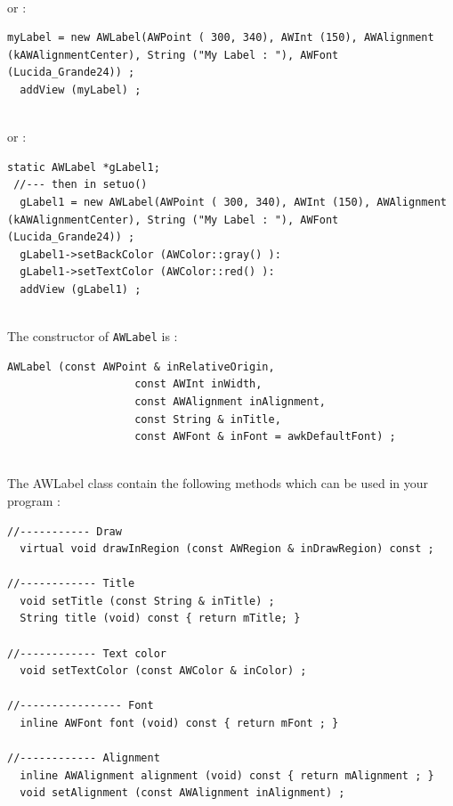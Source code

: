 \documentclass[a4paper,11pt]{extarticle}
\begin{document}
~\\ or :

\begin{lstlisting}[language=Arduinonl]
  myLabel = new AWLabel(AWPoint ( 300, 340), AWInt (150), AWAlignment (kAWAlignmentCenter), String ("My Label : "), AWFont (Lucida_Grande24)) ;
  addView (myLabel) ;
\end{lstlisting}

~\\ or :

\begin{lstlisting}[language=Arduinonl]
 static AWLabel *gLabel1;
 //--- then in setuo()
  gLabel1 = new AWLabel(AWPoint ( 300, 340), AWInt (150), AWAlignment (kAWAlignmentCenter), String ("My Label : "), AWFont (Lucida_Grande24)) ;
  gLabel1->setBackColor (AWColor::gray() ):
  gLabel1->setTextColor (AWColor::red() ):
  addView (gLabel1) ;
\end{lstlisting}

~\\ The constructor of \texttt{AWLabel} is :

\begin{lstlisting}[language=Arduinonl]
  AWLabel (const AWPoint & inRelativeOrigin,
                    const AWInt inWidth,
                    const AWAlignment inAlignment,
                    const String & inTitle,
                    const AWFont & inFont = awkDefaultFont) ;
\end{lstlisting}

~\\ The AWLabel class contain the following methods which can be used in your program :

\begin{lstlisting}[language=Arduinonl]
//----------- Draw
  virtual void drawInRegion (const AWRegion & inDrawRegion) const ;

//------------ Title
  void setTitle (const String & inTitle) ;
  String title (void) const { return mTitle; }

//------------ Text color
  void setTextColor (const AWColor & inColor) ;

//---------------- Font
  inline AWFont font (void) const { return mFont ; }

//------------ Alignment
  inline AWAlignment alignment (void) const { return mAlignment ; }
  void setAlignment (const AWAlignment inAlignment) ;
\end{lstlisting}
\end{document}

